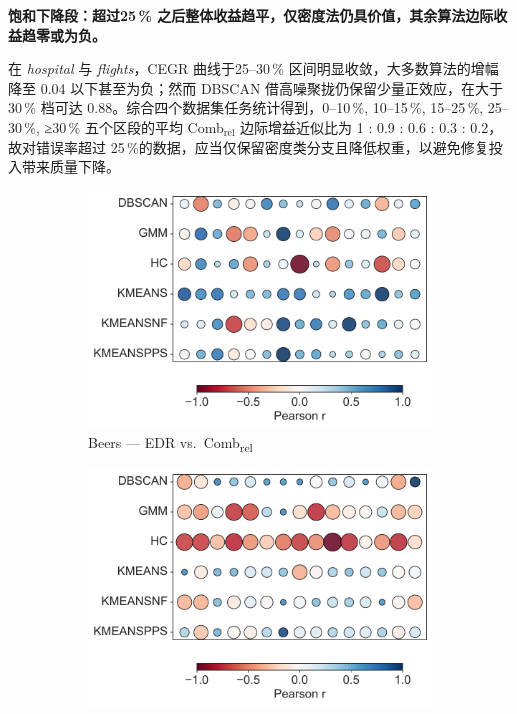 \documentclass[10pt]{article} %
\numberwithin{equation}{section}
\begin{document}
\medskip
\noindent%
\textbf{饱和下降段：超过25\,\% 之后整体收益趋平，仅密度法仍具价值，其余算法边际收益趋零或为负。  }\;

在 \textit{hospital} 与 \textit{flights}，CEGR 曲线于25–30\,\% 区间明显收敛，大多数算法的增幅降至 0.04 以下甚至为负；然而 DBSCAN 借高噪聚拢仍保留少量正效应，在大于30\,\% 档可达 0.88。\textcolor[rgb]{0.00,0.07,1.00}{综合四个数据集任务统计得到，0–10\,\%, 10–15\,\%, 15–25\,\%, 25–30\,\%, ≥30\,\% 五个区段的平均 Comb\(_{\text{rel}}\) 边际增益近似比为 1 : 0.9 : 0.6 : 0.3 : 0.2，故对错误率超过 25\,\%的数据，应当仅保留密度类分支且降低权重，以避免修复投入带来质量下降。}

\begin{figure}[htbp]  %
  \centering
  \begin{subfigure}[b]{0.33\linewidth}
    \includegraphics[width=\linewidth]{figures/6.4.3graph/BE_EDR_vs_Comb_relative.pdf}
    \caption{Beers — EDR vs.\ Comb\textsubscript{rel}}
    \label{fig:be_edr_comb}
  \end{subfigure}\hfill
  \begin{subfigure}[b]{0.33\linewidth}
    \includegraphics[width=\linewidth]{figures/6.4.3graph/BE_F1_vs_Sil_relative.pdf}

\end{subfigure}
\end{figure}
\end{document}
